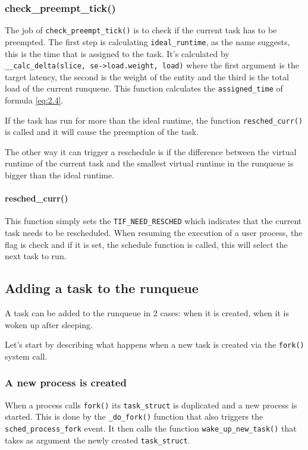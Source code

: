 \documentclass[10pt]{book}
\begin{document}
\subsubsection{check\_preempt\_tick()}

The job of \verb|check_preempt_tick()| is to check if the current task has to be preempted. The first step is calculating \verb|ideal_runtime|, as the name suggests, this is the time that is assigned to the task. It's calculated by \newline \verb|__calc_delta(slice, se->load.weight, load)| where the first argument is the target latency, the second is the weight of the entity and the third is the total load of the current runqueue. This function calculates the \verb|assigned_time| of formula \ref{eq:2.4}.

If the task has run for more than the ideal runtime, the function \verb|resched_curr()| is called and it will cause the preemption of the task.

The other way it can trigger a reschedule is if the difference between the virtual runtime of the current task and the smallest virtual runtime in the runqueue is bigger than the ideal runtime.

\paragraph{resched\_curr()}\label{resched_curr}
This function simply sets the \verb|TIF_NEED_RESCHED| which indicates that the current task needs to be rescheduled. When resuming the execution of a user process, the flag is check and if it is set, the schedule function is called, this will select the next task to run.

  


\subsection{Adding a task to the runqueue}

A task can be added to the runqueue in 2 cases: when it is created, when it is woken up after sleeping.

Let's start by describing what happens when a new task is created via the \verb|fork()| system call.

\subsubsection{A new process is created}
When a process calls \verb|fork()| its \verb|task_struct| is duplicated and a new process is started. This is done by the \verb|_do_fork()| function that also triggers the \verb|sched_process_fork|\label{trace:sched_process_fork} event. It then calls the function \verb|wake_up_new_task()| that takes as argument the newly created \verb|task_struct|.
\end{document}
